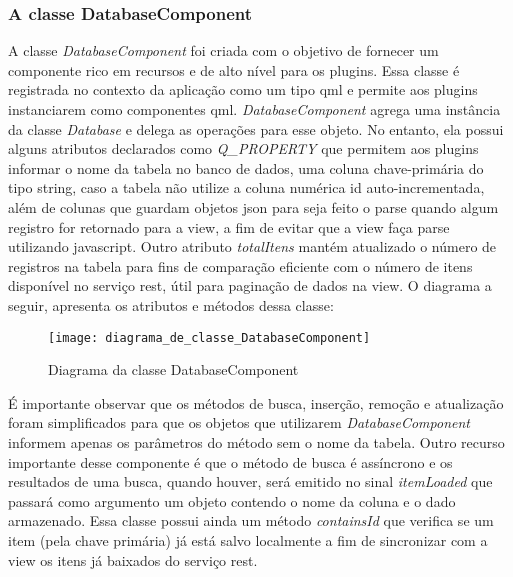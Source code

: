 \subsubsection{A classe DatabaseComponent}\label{sec:solucao-desenvolvida}
A classe \textit{DatabaseComponent} foi criada com o objetivo de fornecer um componente rico em recursos e de alto nível para os plugins. Essa classe é registrada no contexto da aplicação como um tipo qml e permite aos plugins instanciarem como componentes qml. \textit{DatabaseComponent} agrega uma instância da classe \textit{Database} e delega as operações para esse objeto. No entanto, ela possui alguns atributos declarados como \textit{Q\_PROPERTY} que permitem aos plugins informar o nome da tabela no banco de dados, uma coluna chave-primária do tipo string, caso a tabela não utilize a coluna numérica id auto-incrementada, além de colunas que guardam objetos json para seja feito o parse quando algum registro for retornado para a view, a fim de evitar que a view faça parse utilizando javascript. Outro atributo \textit{totalItens} mantém atualizado o número de registros na tabela para fins de comparação eficiente com o número de itens disponível no serviço rest, útil para paginação de dados na view. O diagrama a seguir, apresenta os atributos e métodos dessa classe:

\begin{figure}[H]
	\texttt{[image: diagrama\_de\_classe\_DatabaseComponent]}
	\centering
	\caption{Diagrama da classe DatabaseComponent}
\end{figure}

É importante observar que os métodos de busca, inserção, remoção e atualização foram simplificados para que os objetos que utilizarem \textit{DatabaseComponent} informem apenas os parâmetros do método sem o nome da tabela. Outro recurso importante desse componente é que o método de busca é assíncrono e os resultados de uma busca, quando houver, será emitido no sinal \textit{itemLoaded} que passará como argumento um objeto contendo o nome da coluna e o dado armazenado. Essa classe possui ainda um método \textit{containsId} que verifica se um item (pela chave primária) já está salvo localmente a fim de sincronizar com a view os itens já baixados do serviço rest.

